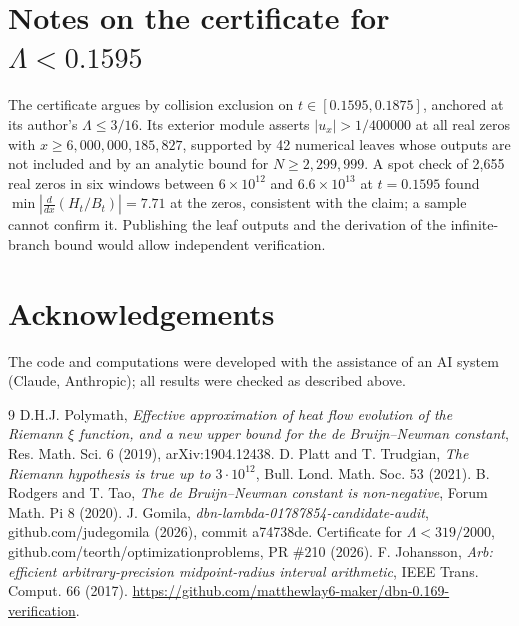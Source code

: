 \documentclass[11pt]{amsart}
\newcommand{\repourl}{https://github.com/matthewlay6-maker/dbn-0.169-verification}
\begin{document}
\appendix
\section{Notes on the certificate for $\Lambda<0.1595$}\label{app:audit}
The certificate \cite{cert} argues by collision exclusion on $t\in[0.1595,0.1875]$, anchored at its author's
$\Lambda\le3/16$. Its exterior module asserts $|u_x|>1/400000$ at all real zeros with $x\ge6{,}000{,}000{,}185{,}827$,
supported by 42 numerical leaves whose outputs are not included and by an analytic bound for $N\ge2{,}299{,}999$.
A spot check of 2{,}655 real zeros in six windows between $6\times10^{12}$ and $6.6\times10^{13}$ at $t=0.1595$ found
$\min|\tfrac{d}{dx}(H_t/B_t)|=7.71$ at the zeros, consistent with the claim; a sample cannot confirm it. Publishing the
leaf outputs and the derivation of the infinite-branch bound would allow independent verification.

\section*{Acknowledgements}
The code and computations were developed with the assistance of an AI system (Claude, Anthropic); all results were checked as described above.

\begin{thebibliography}{9}
 D.H.J. Polymath, \emph{Effective approximation of heat flow evolution of the Riemann $\xi$ function, and a new upper bound for the de Bruijn--Newman constant}, Res. Math. Sci. 6 (2019), arXiv:1904.12438.
 D. Platt and T. Trudgian, \emph{The Riemann hypothesis is true up to $3\cdot10^{12}$}, Bull. Lond. Math. Soc. 53 (2021).
 B. Rodgers and T. Tao, \emph{The de Bruijn--Newman constant is non-negative}, Forum Math. Pi 8 (2020).
 J. Gomila, \emph{dbn-lambda-01787854-candidate-audit}, github.com/judegomila (2026), commit a74738de.
 Certificate for $\Lambda<319/2000$, github.com/teorth/optimizationproblems, PR \#210 (2026).
 F. Johansson, \emph{Arb: efficient arbitrary-precision midpoint-radius interval arithmetic}, IEEE Trans. Comput. 66 (2017).
 \url{\repourl}.
\end{thebibliography}
\end{document}
